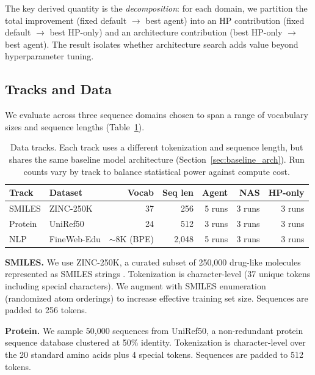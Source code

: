 The key derived quantity is the \emph{decomposition}: for each domain, we partition the total improvement (fixed default $\to$ best agent) into an HP contribution (fixed default $\to$ best HP-only) and an architecture contribution (best HP-only $\to$ best agent). The result isolates whether architecture search adds value beyond hyperparameter tuning.

\subsection{Tracks and Data}
\label{sec:tracks_data}

We evaluate across three sequence domains chosen to span a range of vocabulary sizes and sequence lengths (Table~\ref{tab:tracks}).

\begin{table}[t]
\centering
\caption{Data tracks. Each track uses a different tokenization and sequence length, but shares the same baseline model architecture (Section~\ref{sec:baseline_arch}). Run counts vary by track to balance statistical power against compute cost.}
\label{tab:tracks}
\small
\begin{tabular}{@{}llrrrrr@{}}
\toprule
\textbf{Track} & \textbf{Dataset} & \textbf{Vocab} & \textbf{Seq len} & \textbf{Agent} & \textbf{NAS} & \textbf{HP-only} \\
\midrule
SMILES & ZINC-250K \citep{irwin2005zinc} & 37 & 256 & 5 runs & 3 runs & 3 runs \\
Protein & UniRef50 \citep{suzek2015uniref} & 24 & 512 & 3 runs & 3 runs & 3 runs \\
NLP & FineWeb-Edu \citep{penedo2024fineweb} & ${\sim}$8K (BPE) & 2{,}048 & 5 runs & 3 runs & 3 runs \\
\bottomrule
\end{tabular}
\end{table}

\textbf{SMILES.}
We use ZINC-250K, a curated subset of 250{,}000 drug-like molecules represented as SMILES strings \citep{weininger1988smiles}. Tokenization is character-level (37 unique tokens including special characters). We augment with SMILES enumeration (randomized atom orderings) to increase effective training set size. Sequences are padded to 256 tokens.

\textbf{Protein.}
We sample 50{,}000 sequences from UniRef50, a non-redundant protein sequence database clustered at 50\% identity. Tokenization is character-level over the 20 standard amino acids plus 4 special tokens. Sequences are padded to 512 tokens.

